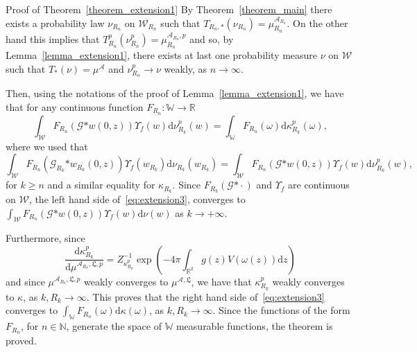 \documentclass[a4paper,10pt]{article}
\newcommand{\asterisk}{\mathord{*}}
\newcommand{\mathd}{\mathrm{d}}
\newenvironment{proof*}[1]{\noindent\textbf{#1\ }}{\hspace*{\fill}$\Box$\medskip}
\begin{document}
\begin{proof*}{Proof of Theorem~\ref{theorem_extension1}}
  By Theorem~\ref{theorem_main} there exists a probability law $\nu_{R_n}$ on
  $\mathcal{W}_{R_n}$ such that $T_{R_n, \asterisk} (\nu_{R_n}) =
  \mu^{\mathcal{A}_{R_n}}_{R_n}$. On the other hand this implies that
  $T^p_{R_n} (\nu_{R_n}^p) = \mu^{\mathcal{A}_{R_n}, p}_{R_n}$ and so, by
  Lemma~\ref{lemma_extension1}, there exists at last one probability measure
  $\nu$ on $\mathcal{W}$ such that $T_{\asterisk} (\nu) = \mu^{\mathcal{A}}$
  and $\nu^p_{R_n} \rightarrow \nu$ weakly, as $n \rightarrow \infty$.
  
  Then, using the notations of the proof of Lemma~\ref{lemma_extension1}, we
  have that for any continuous function $F_{R_n} : \mathbb{W} \rightarrow
  \mathbb{R}$
  \begin{equation}
    \int_{\mathcal{W}} F_{R_n} (\mathcal{G} \asterisk w (0, z)) \Upsilon_f (w)
    \mathd \nu^p_{R_k} (w) = \int_{\mathbb{W}} F_{R_n} (\omega) \mathd
    \kappa_{R_k}^p (\omega), \label{eq:extension3}
  \end{equation}
  where we used that
  \[ \int_{\mathcal{W}} F_{R_n} (\mathcal{G}_{R_k} \asterisk w_{R_k} (0, z))
     \Upsilon_f (w_{R_k}) \mathd \nu_{R_k} (w_{R_k}) = \int_{\mathcal{W}}
     F_{R_n} (\mathcal{G} \asterisk w (0, z)) \Upsilon_f (w) \mathd
     \nu^p_{R_k} (w), \]
  for $k \geqslant n$ and a similar equality for $\kappa_{R_k}$. Since
  $F_{R_k} (\mathcal{G} \asterisk \cdot)$ and $\Upsilon_f$ are continuous on
  $\mathcal{W}$, the left hand side of~{\eqref{eq:extension3}}, converges to
  $\int_{\mathcal{W}} F_{R_n} (\mathcal{G} \asterisk w (0, z)) \Upsilon_f (w)
  \mathd \nu (w)$ as $k \rightarrow + \infty$.
  
  Furthermore, since
  \[ \left. \frac{\mathd \kappa_{R_k}^p}{\mathd \mu^{\mathcal{A}_{R_k}
     \mathfrak{, L}, p}} = Z^{- 1}_{\kappa_{R_k}^p} \right. \left. \exp \left(
     - 4 \pi \int_{\mathbb{R}^2} g (z) V (\omega (z)) \mathd z \right) \right.
  \]
  and since $\mu^{\mathcal{A}_{R_k} \mathfrak{, L}, p}$ weakly converges to
  $\mu^{\mathcal{A}, \mathfrak{L}}$, we have that $\kappa^p_{R_k}$ weakly
  converges to $\kappa$, as $k, R_k \rightarrow \infty$. This proves that the
  right hand side of~{\eqref{eq:extension3}} converges to $\int_{\mathbb{W}}
  F_{R_n} (\omega) \mathd \kappa (\omega)$, as $k, R_k \rightarrow \infty$.
  Since the functions of the form $F_{R_n}$, for $n \in \mathbb{N}$, generate
  the space of $\mathbb{W}$ measurable functions, the theorem is proved.
\end{proof*}
\end{document}
